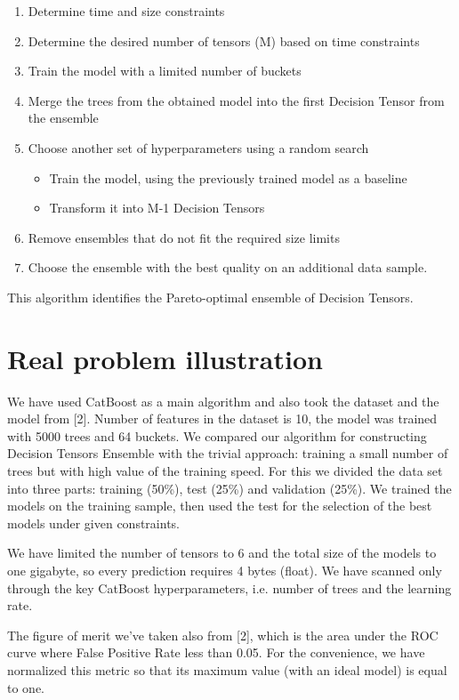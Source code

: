 \documentclass[a4paper]{jpconf}
\begin{document}
\medskip
\renewcommand{\theenumi}{\arabic{enumi}}
\begin{enumerate}
\item Determine time and size constraints
\item Determine the desired number of tensors (M) based on time constraints
\item Train the model with a limited number of buckets
\item Merge the trees from the obtained model into the first Decision Tensor from the ensemble
\item Choose another set of hyperparameters using a random search
\medskip
\begin{itemize}
\item Train the model, using the previously trained model as a baseline
\item Transform it into M-1 Decision Tensors
\end{itemize}
\item Remove ensembles that do not fit the required size limits
\item Choose the ensemble with the best quality on an additional data sample.
\end{enumerate}

This algorithm identifies the Pareto-optimal ensemble of Decision Tensors.

\section{Real problem illustration}

We have used CatBoost as a main algorithm and also took the dataset and the model from [2]. Number of features in the dataset is 10, the model was trained with 5000 trees and 64 buckets. We compared our algorithm for constructing Decision Tensors Ensemble with the trivial approach: training a small number of trees but with high value of the training speed.
For this we divided the data set into three parts: training (50\%), test (25\%) and validation (25\%). We trained the models on the training sample, then used the test for the selection of the best models under given constraints.

We have limited the number of tensors to 6 and the total size of the models to one gigabyte, so every prediction requires 4 bytes (float). We have scanned only through the key CatBoost hyperparameters, i.e. number of trees and the learning rate.

The figure of merit we've taken also from [2], which is the area under the ROC curve where False Positive Rate less than 0.05. For the convenience, we have normalized this metric so that its maximum value (with an ideal model) is equal to one.
\end{document}
